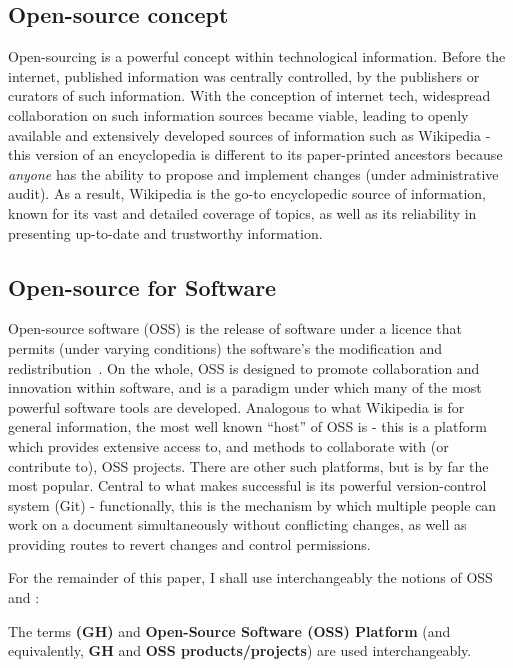 \subsection{Open-source concept}

Open-sourcing is a powerful concept within technological information. Before the internet, published information was centrally controlled, by the publishers or curators of such information.
With the conception of internet tech, widespread collaboration on such information sources became viable, leading to openly available and extensively developed sources of information such as Wikipedia - this version of an encyclopedia is different to its paper-printed ancestors because \emph{anyone} has the ability to propose and implement changes (under administrative audit).
As a result, Wikipedia is the go-to encyclopedic source of information, known for its vast and detailed coverage of topics, as well as its reliability in presenting up-to-date and trustworthy information.

\subsection{Open-source for Software}
Open-source software (OSS) is the release of software under a licence that permits (under varying conditions) the software's the modification and redistribution~\cite{_2025_OpensourceSoftware}.
On the whole, OSS is designed to promote collaboration and innovation within software, and is a paradigm under which many of the most powerful software tools are developed.
Analogous to what Wikipedia is for general information, the most well known ``host'' of OSS is \gh{} - this is a platform which provides extensive access to, and methods to collaborate with (or contribute to), OSS projects. There are other such platforms, but \gh{} is by far the most popular.
Central to what makes \gh{} successful is its powerful version-control system (Git) - functionally, this is the mechanism by which multiple people can work on a document simultaneously without conflicting changes, as well as providing routes to revert changes and control permissions.

For the remainder of this paper, I shall use interchangeably the notions of OSS and \gh{}:
\begin{tcolorbox}[colback=gray!5!white,colframe=black!50,title=Stipulation]
  The terms \textbf{\gh{} (GH)} and \textbf{Open-Source Software (OSS) Platform} (and equivalently, \textbf{GH \repos{}} and \textbf{OSS products/projects}) are used interchangeably.
\end{tcolorbox}

